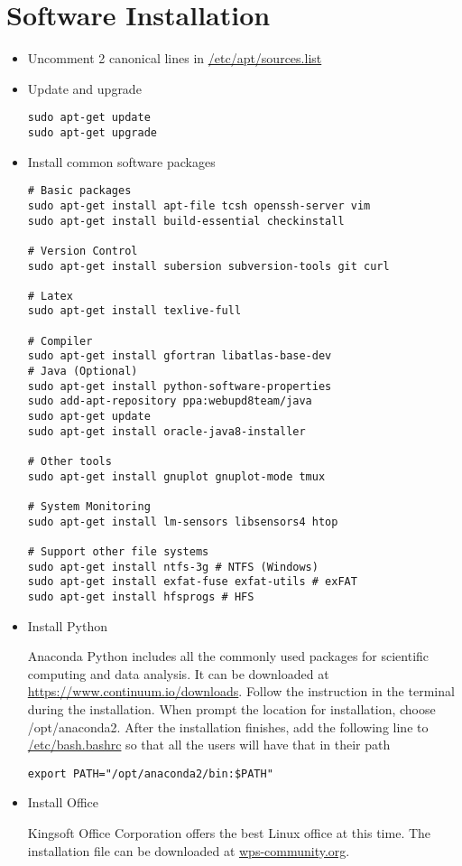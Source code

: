 \documentclass[12pt]{article}
\begin{document}
\section{Software Installation}
\begin{itemize}
\item Uncomment 2 canonical lines in \url{/etc/apt/sources.list}
\item Update and upgrade
\begin{Verbatim}
sudo apt-get update
sudo apt-get upgrade
\end{Verbatim}
\item Install common software packages
\begin{Verbatim}
# Basic packages
sudo apt-get install apt-file tcsh openssh-server vim
sudo apt-get install build-essential checkinstall

# Version Control
sudo apt-get install subersion subversion-tools git curl

# Latex
sudo apt-get install texlive-full

# Compiler
sudo apt-get install gfortran libatlas-base-dev
# Java (Optional)
sudo apt-get install python-software-properties
sudo add-apt-repository ppa:webupd8team/java
sudo apt-get update
sudo apt-get install oracle-java8-installer

# Other tools
sudo apt-get install gnuplot gnuplot-mode tmux

# System Monitoring
sudo apt-get install lm-sensors libsensors4 htop

# Support other file systems
sudo apt-get install ntfs-3g # NTFS (Windows)
sudo apt-get install exfat-fuse exfat-utils # exFAT
sudo apt-get install hfsprogs # HFS

\end{Verbatim}

\item Install Python

Anaconda Python includes all the commonly used packages for scientific computing and data analysis.
It can be downloaded at \url{https://www.continuum.io/downloads}.
Follow the instruction in the terminal during the installation.
When prompt the location for installation, choose /opt/anaconda2.
After the installation finishes, add the following line to \url{/etc/bash.bashrc} so that all the users will have that in their path
\begin{Verbatim}
export PATH="/opt/anaconda2/bin:$PATH"
\end{Verbatim}

\item Install Office

Kingsoft Office Corporation offers the best Linux office at this time.
The installation file can be downloaded at \url{wps-community.org}.

\end{itemize}
\end{document}
